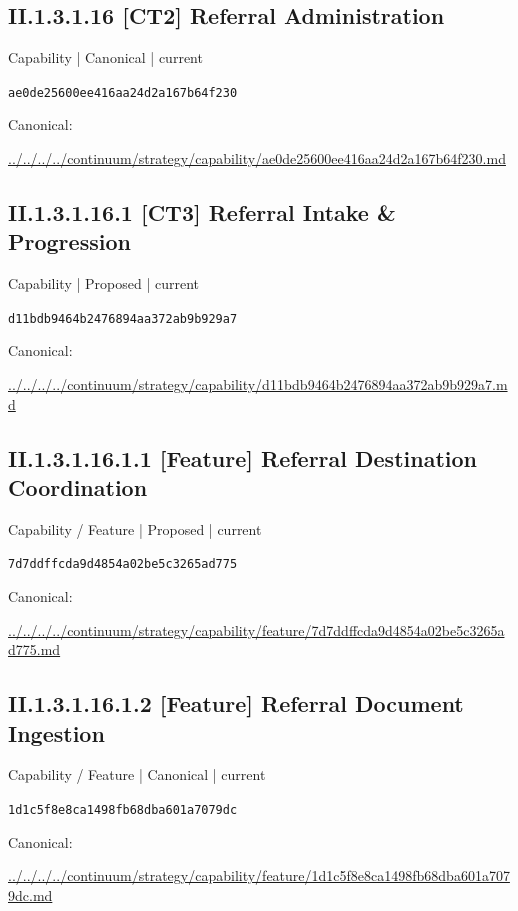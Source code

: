 \documentclass[10pt,a4paper]{article}
\begin{document}
\subsection*{II.1.3.1.16 [CT2] Referral Administration}
{\small Capability | Canonical | current}\par
\texttt{ae0de25600ee416aa24d2a167b64f230}\par
Canonical: \par
{\footnotesize\url{../../../../continuum/strategy/capability/ae0de25600ee416aa24d2a167b64f230.md}}\par
\subsection*{II.1.3.1.16.1 [CT3] Referral Intake \& Progression}
{\small Capability | Proposed | current}\par
\texttt{d11bdb9464b2476894aa372ab9b929a7}\par
Canonical: \par
{\footnotesize\url{../../../../continuum/strategy/capability/d11bdb9464b2476894aa372ab9b929a7.md}}\par
\subsection*{II.1.3.1.16.1.1 [Feature] Referral Destination Coordination}
{\small Capability / Feature | Proposed | current}\par
\texttt{7d7ddffcda9d4854a02be5c3265ad775}\par
Canonical: \par
{\footnotesize\url{../../../../continuum/strategy/capability/feature/7d7ddffcda9d4854a02be5c3265ad775.md}}\par
\subsection*{II.1.3.1.16.1.2 [Feature] Referral Document Ingestion}
{\small Capability / Feature | Canonical | current}\par
\texttt{1d1c5f8e8ca1498fb68dba601a7079dc}\par
Canonical: \par
{\footnotesize\url{../../../../continuum/strategy/capability/feature/1d1c5f8e8ca1498fb68dba601a7079dc.md}}\par
\end{document}
